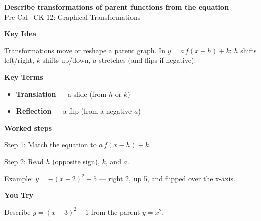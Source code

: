 \documentclass[12pt]{article}
\begin{document}
\begin{center}{\Large \textbf{Describe transformations of parent functions from the equation}}\\[2pt]{\small Pre-Cal \textbar\ CK-12: Graphical Transformations}\end{center}\vspace{0.25cm}

{\large\textbf{Key Idea}}\par\smallskip
Transformations move or reshape a parent graph. In $y=a\,f(x-h)+k$: $h$ shifts left/right, $k$ shifts up/down, $a$ stretches (and flips if negative).\par


{\large\textbf{Key Terms}}\par\smallskip
\begin{itemize}[leftmargin=1.4em]
  \item \textbf{Translation} — a slide (from $h$ or $k$)
  \item \textbf{Reflection} — a flip (from a negative $a$)
\end{itemize}


{\large\textbf{Worked steps}}\par\smallskip
Step 1: Match the equation to $a\,f(x-h)+k$.\par
Step 2: Read $h$ (opposite sign), $k$, and $a$.\par
Example: $y=-(x-2)^2+5$ — right 2, up 5, and flipped over the x-axis.\par


{\large\textbf{You Try}}\par\smallskip
Describe $y=(x+3)^2-1$ from the parent $y=x^2$.\par
\end{document}
